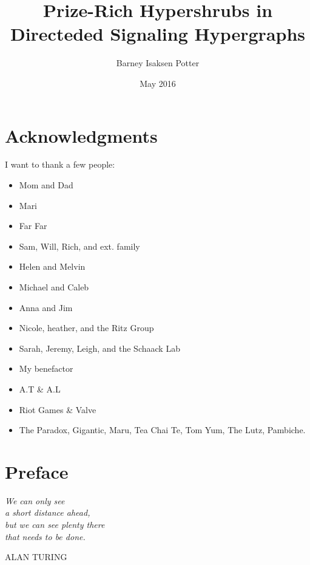 \documentclass[12pt,twoside]{reedthesis}
\title{Prize-Rich Hypershrubs in Directeded Signaling Hypergraphs}
\author{Barney Isaksen Potter}
\date{May 2016}
\theoremstyle{definition}
\newlength\longest
\begin{document}
  \maketitle
  \frontmatter %
  \pagestyle{empty} %

    \chapter*{Acknowledgments}
	I want to thank a few people:

  \begin{itemize}
    \item{Mom and Dad}
    \item{Mari}
    \item{Far Far}
    \item{Sam, Will, Rich, and ext. family}
    \item{Helen and Melvin}
    \item{Michael and Caleb}
    \item{Anna and Jim}
    \item{Nicole, heather, and the Ritz Group}
    \item{Sarah, Jeremy, Leigh, and the Schaack Lab}
    \item{My benefactor}
    \item{A.T \& A.L} %
    \item{Riot Games \& Valve}
    \item{The Paradox, Gigantic, Maru, Tea Chai Te, Tom Yum, The Lutz, Pambiche.}
  \end{itemize}

    \chapter*{Preface}
  \null\vfill

\settowidth{}
\begin{center}
\parbox{\longest}{%
  \raggedright{\huge\itshape%
   We can only see \\
  a short distance ahead, \\
  but we can see plenty there \\
  that needs to be done.\par\bigskip
  }
  \raggedleft\Large\MakeUppercase{Alan Turing}\par%
}
\end{center}
\end{document}
